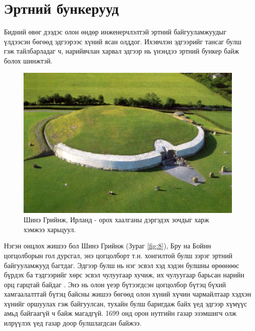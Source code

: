 \documentclass[10pt,twocolumn,letterpaper]{article}
\begin{document}
\section{Эртний бункерууд}

Бидний өвөг дээдэс олон өндөр инженерчлэлтэй эртний байгууламжуудыг үлдээсэн бөгөөд эдгээрээс хүний ясан олддог. Ихэвчлэн эдгээрийг тансаг булш гэж тайлбарладаг ч, нарийвчлан харвал эдгээр нь үнэндээ эртний бункер байж болох шинжтэй.

\begin{figure}[b]
\begin{center}
   \includegraphics[width=1\linewidth]{ww19.jpg}
\end{center}
   \caption{Шинэ Грийнж, Ирланд - орох хаалганы дэргэдэх зочдыг харж хэмжээ харьцуул.}
\label{fig:8}
\label{fig:onecol}
\end{figure}

Нэгэн онцлох жишээ бол Шинэ Грийнж (Зураг \ref{fig:8}), Бру на Бойнн цогцолборын гол дурсгал, энэ цогцолборт т.н. хонгилтой булш зэрэг эртний байгууламжууд багтдаг. Эдгээр булш нь нэг эсвэл хэд хэдэн булшны өрөөнөөс бүрдэх ба тэдгээрийг хөрс эсвэл чулуугаар хучиж, их чулуугаар барьсан нарийн орц гарцтай байдаг \cite{70}. Энэ нь олон үеэр бүтээгдсэн цогцолбор бүтэц бүхий хамгаалалттай бүтэц байсны жишээ бөгөөд олон хүний хүчин чармайлтаар хэдхэн хүнийг оршуулах гэж байгуулсан, тухайн булш баригдаж байх үед эдгээр хүмүүс амьд байгаагүй ч байж магадгүй. 1699 онд орон нутгийн газар эзэмшигч олж илрүүлэх үед газар доор булшлагдсан байжээ.
\end{document}
